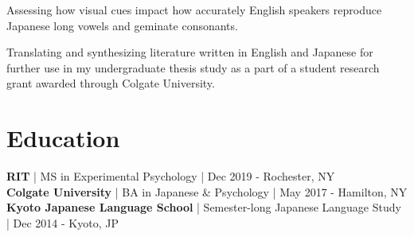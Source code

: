 \documentclass[letterpaper]{deedy-resume_sm} %
\begin{document}
\begin{tightitemize}
\item Assessing how visual cues impact how accurately English speakers reproduce Japanese long vowels and geminate consonants.
\end{tightitemize}
\begin{tightitemize}
\item Translating and synthesizing literature written in English and Japanese for further use in my undergraduate thesis study as a part of a student research grant awarded through Colgate University.
\end{tightitemize}

\section{Education} 
\textbf{RIT} | MS in Experimental Psychology | Dec 2019 - Rochester, NY\\
\textbf{Colgate University} | BA in Japanese \& Psychology | May 2017 - Hamilton, NY\\
\textbf{Kyoto Japanese Language School} | Semester-long Japanese Language Study | Dec 2014 - Kyoto, JP\\

\end{document}
